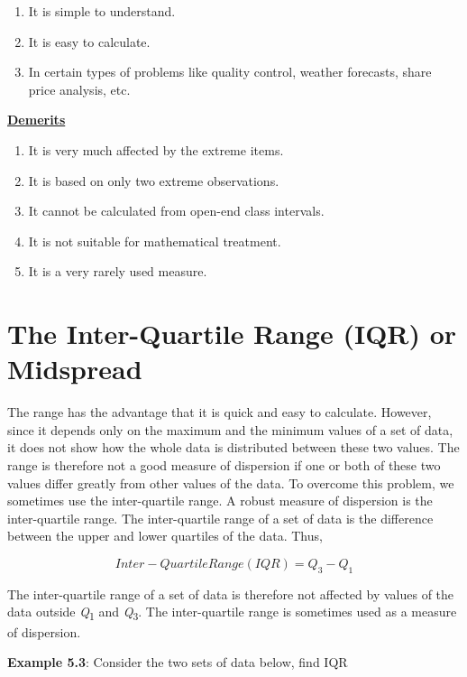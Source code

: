 \documentclass[
]{book}
\begin{document}
\begin{enumerate}
\def\labelenumi{\arabic{enumi}.}
\item
  It is simple to understand.
\item
  It is easy to calculate.
\item
  In certain types of problems like quality control, weather
  forecasts, share price analysis, etc.
\end{enumerate}

\ul{\textbf{Demerits}}

\begin{enumerate}
\def\labelenumi{\arabic{enumi}.}
\item
  It is very much affected by the extreme items.
\item
  It is based on only two extreme observations.
\item
  It cannot be calculated from open-end class intervals.
\item
  It is not suitable for mathematical treatment.
\item
  It is a very rarely used measure.
\end{enumerate}

\section{The Inter-Quartile Range (IQR) or Midspread}\label{the-inter-quartile-range-iqr-or-midspread}

The range has the advantage that it is quick and easy to calculate.
However, since it depends only on the maximum and the minimum values of
a set of data, it does not show how the whole data is distributed
between these two values. The range is therefore not a good measure of
dispersion if one or both of these two values differ greatly from other
values of the data. To overcome this problem, we sometimes use the
inter-quartile range. A robust measure of dispersion is the
inter-quartile range. The inter-quartile range of a set of data is the
difference between the upper and lower quartiles of the data. Thus,

\[Inter-Quartile Range (IQR) = Q_3 - Q_1\]

The inter-quartile range of a set of data is therefore not affected by
values of the data outside \emph{Q}\textsubscript{1} and \emph{Q}\textsubscript{3}. The inter-quartile range
is sometimes used as a measure of dispersion.

\textbf{Example 5.3}: Consider the two sets of data below, find IQR
\end{document}
